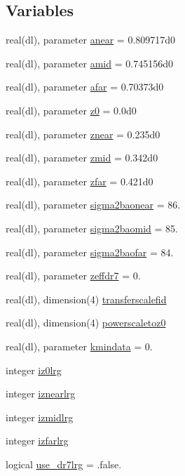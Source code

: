 \subsection*{Variables}
\begin{DoxyCompactItemize}
\item 
real(dl), parameter \mbox{\hyperlink{namespacelrggettheory_ad88af273771f3d0810522480b47f084e}{anear}} = 0.\+809717d0
\item 
real(dl), parameter \mbox{\hyperlink{namespacelrggettheory_a48262968a1e96ae340aba94f24aec1b5}{amid}} = 0.\+745156d0
\item 
real(dl), parameter \mbox{\hyperlink{namespacelrggettheory_aa16430b41b5ca2ad21489fad80db335e}{afar}} = 0.\+70373d0
\item 
real(dl), parameter \mbox{\hyperlink{namespacelrggettheory_a61f36f4870164e55af7c3e7124dc2051}{z0}} = 0.\+0d0
\item 
real(dl), parameter \mbox{\hyperlink{namespacelrggettheory_a8019779a854e5df4d48c67aa0458a991}{znear}} = 0.\+235d0
\item 
real(dl), parameter \mbox{\hyperlink{namespacelrggettheory_adc42a24b86f4427b3cfcd22912853cfa}{zmid}} = 0.\+342d0
\item 
real(dl), parameter \mbox{\hyperlink{namespacelrggettheory_a8666fd6c319e844d505b0506d3615396}{zfar}} = 0.\+421d0
\item 
real(dl), parameter \mbox{\hyperlink{namespacelrggettheory_a60e1f4a4277039bd2beed6d16a68cdb8}{sigma2baonear}} = 86.
\item 
real(dl), parameter \mbox{\hyperlink{namespacelrggettheory_a790fd2fc4eb449f6186182aba3193ffc}{sigma2baomid}} = 85.
\item 
real(dl), parameter \mbox{\hyperlink{namespacelrggettheory_a0b413a1881bdf3f3a733ca712582fad3}{sigma2baofar}} = 84.
\item 
real(dl), parameter \mbox{\hyperlink{namespacelrggettheory_a9e12f939a877e873665d4c49aa5f2ba9}{zeffdr7}} = 0.
\item 
real(dl), dimension(4) \mbox{\hyperlink{namespacelrggettheory_a51576c1d8204fb297c9cde00f78c0a35}{transferscalefid}}
\item 
real(dl), dimension(4) \mbox{\hyperlink{namespacelrggettheory_a8538d769c081d503ae250aa4ddfa538c}{powerscaletoz0}}
\item 
real(dl), parameter \mbox{\hyperlink{namespacelrggettheory_a32295c6e11071f61c6311cac0eec283b}{kmindata}} = 0.
\item 
integer \mbox{\hyperlink{namespacelrggettheory_a39a758c0ae68d61dcd4eea5015d41452}{iz0lrg}}
\item 
integer \mbox{\hyperlink{namespacelrggettheory_aa624d661acd194fa705994f91f5ab639}{iznearlrg}}
\item 
integer \mbox{\hyperlink{namespacelrggettheory_ae25e82fd80684bfff1b6eda6a260d2fc}{izmidlrg}}
\item 
integer \mbox{\hyperlink{namespacelrggettheory_aa2ed4be471b8ee09ea67a2cf685a7f08}{izfarlrg}}
\item 
logical \mbox{\hyperlink{namespacelrggettheory_acc2389105d05edd7e5efbf830641adb7}{use\+\_\+dr7lrg}} = .false.
\end{DoxyCompactItemize}


